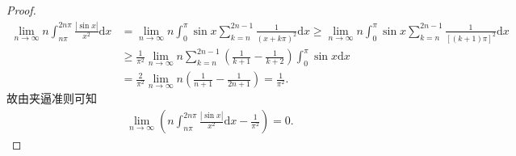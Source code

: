 \documentclass[../../main.tex]{subfiles}%
\begin{document}
\begin{proof}
\begin{align*}
\lim_{n \to \infty} n \int_{n\pi}^{2n\pi} \frac{|\sin x|}{x^2} \mathrm{d}x &= \lim_{n \to \infty} n \int_0^{\pi} \sin x \sum_{k=n}^{2n - 1} \frac{1}{(x + k\pi)^2} \mathrm{d}x \geqslant  \lim_{n \to \infty} n \int_0^{\pi} \sin x \sum_{k=n}^{2n - 1} \frac{1}{[(k + 1)\pi]^2} \mathrm{d}x 
\\
&\geqslant  \frac{1}{\pi^2} \lim_{n \to \infty} n \sum_{k=n}^{2n - 1} \left( \frac{1}{k + 1} - \frac{1}{k + 2} \right) \int_0^{\pi} \sin x \mathrm{d}x \\
&= \frac{2}{\pi^2} \lim_{n \to \infty} n \left( \frac{1}{n + 1} - \frac{1}{2n + 1} \right) = \frac{1}{\pi^2}.
\end{align*}
故由夹逼准则可知
\begin{align*}
\lim_{n \to \infty} \left( n \int_{n\pi}^{2n\pi} \frac{|\sin x|}{x^2} \mathrm{d}x - \frac{1}{\pi^2} \right) = 0.
\end{align*}
\end{proof}
\end{document}
